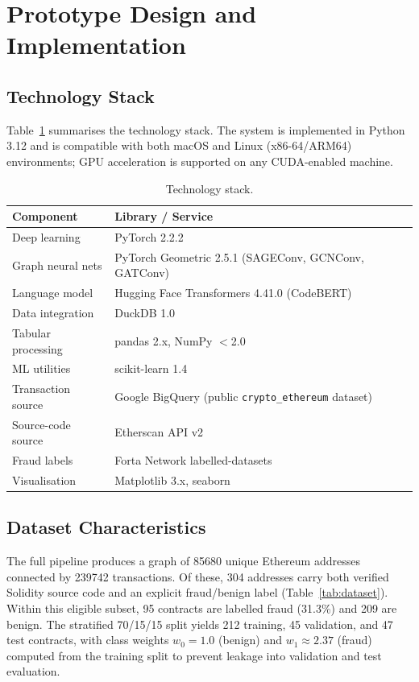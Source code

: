 \section{Prototype Design and Implementation}
\label{sec:prototype}

\subsection{Technology Stack}

Table~\ref{tab:stack} summarises the technology stack.  The system is
implemented in Python 3.12 and is compatible with both macOS and Linux
(x86-64/ARM64) environments; GPU acceleration is supported on any
CUDA-enabled machine.

\begin{table}[t]
\centering
\caption{Technology stack.}
\label{tab:stack}
\begin{tabular}{ll}
\toprule
Component & Library / Service \\
\midrule
Deep learning       & PyTorch 2.2.2 \\
Graph neural nets   & PyTorch Geometric 2.5.1 (SAGEConv, GCNConv, GATConv) \\
Language model      & Hugging Face Transformers 4.41.0 (CodeBERT) \\
Data integration    & DuckDB 1.0 \\
Tabular processing  & pandas 2.x, NumPy $<$2.0 \\
ML utilities        & scikit-learn 1.4 \\
Transaction source  & Google BigQuery (public \texttt{crypto\_ethereum} dataset) \\
Source-code source  & Etherscan API v2 \\
Fraud labels        & Forta Network labelled-datasets~\cite{fortalabels} \\
Visualisation       & Matplotlib 3.x, seaborn \\
\bottomrule
\end{tabular}
\end{table}

\subsection{Dataset Characteristics}

The full pipeline produces a graph of \num{85680} unique Ethereum
addresses connected by \num{239742} transactions.  Of these, \num{304}
addresses carry both verified Solidity source code and an explicit
fraud/benign label (Table~\ref{tab:dataset}).  Within this eligible
subset, 95 contracts are labelled fraud (31.3\%) and 209 are benign.
The stratified 70/15/15 split yields 212 training, 45 validation, and
47 test contracts, with class weights $w_0 = 1.0$ (benign) and
$w_1 \approx 2.37$ (fraud) computed from the training split to prevent
leakage into validation and test evaluation.

